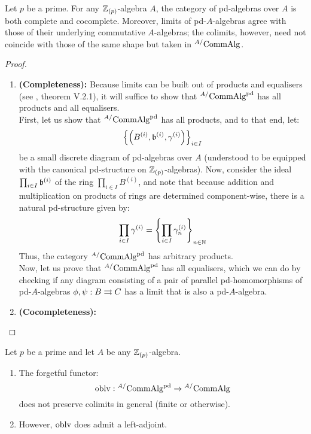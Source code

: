                 \begin{proposition}
                    Let $p$ be a prime. For any $\mathbb{Z}_{(p)}$-algebra $A$, the category of pd-algebras over $A$ is both complete and cocomplete. Moreover, limits of pd-$A$-algebras agree with those of their underlying commutative $A$-algebras; the colimits, however, need not coincide with those of the same shape but taken in ${}^{A/}\mathrm{Comm}\mathrm{Alg}$. 
                \end{proposition}
                    \begin{proof}
                        \noindent
                        \begin{enumerate}
                            \item \textbf{(Completeness):} Because limits can be built out of products and equalisers (see \cite{maclane}, theorem V.2.1), it will suffice to show that ${}^{A/}\mathrm{Comm}\mathrm{Alg}^{\mathrm{pd}}$ has all products and all equalisers.
                            \\
                            First, let us show that ${}^{A/}\mathrm{Comm}\mathrm{Alg}^{\mathrm{pd}}$ has all products, and to that end, let:
                                $$\left\{\left(B^{(i)}, \mathfrak{b}^{(i)}, \gamma^{(i)}\right)\right\}_{i \in I}$$
                            be a small discrete diagram of pd-algebras over $A$ (understood to be equipped with the canonical pd-structure on $\mathbb{Z}_{(p)}$-algebras). Now, consider the ideal $\prod_{i \in I} \mathfrak{b}^{(i)}$ of the ring $\prod_{i \in I} B^{(i)}$, and note that because addition and multiplication on products of rings are determined component-wise, there is a natural pd-structure given by:
                                $$\prod_{i \in I} \gamma^{(i)} = \left\{\prod_{i \in I} \gamma_n^{(i)}\right\}_{n \in \mathbb{N}}$$
                            Thus, the category ${}^{A/}\mathrm{Comm}\mathrm{Alg}^{\mathrm{pd}}$ has arbitrary products. 
                            \\
                            Now, let us prove that ${}^{A/}\mathrm{Comm}\mathrm{Alg}^{\mathrm{pd}}$ has all equalisers, which we can do by checking if any diagram consisting of a pair of parallel pd-homomorphisms of pd-$A$-algebras $\phi, \psi: B \rightrightarrows C$ has a limit that is also a pd-$A$-algebra.  
                            \item \textbf{(Cocompleteness):}
                        \end{enumerate}
                    \end{proof}
                \begin{corollary} \label{coro: free_PD_algebras}
                    Let $p$ be a prime and let $A$ be any $\mathbb{Z}_{(p)}$-algebra. 
                        \begin{enumerate}
                            \item The forgetful functor:
                                $$\mathrm{oblv}: {}^{A/}\mathrm{Comm}\mathrm{Alg}^{\mathrm{pd}} \to {}^{A/}\mathrm{Comm}\mathrm{Alg}$$
                            does not preserve colimits in general (finite or otherwise). 
                            \item However, $\mathrm{oblv}$ does admit a left-adjoint.
                        \end{enumerate}
                \end{corollary}
